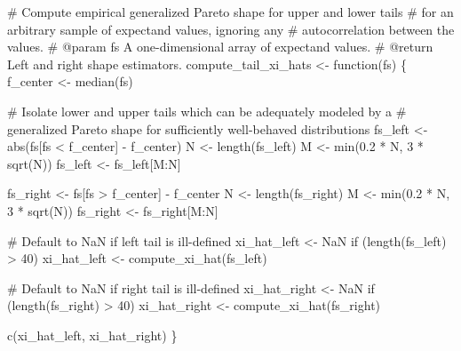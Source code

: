 \documentclass[
  letterpaper,
  DIV=11,
  numbers=noendperiod]{scrartcl}
\newenvironment{Shaded}{\begin{snugshade}}{\end{snugshade}}
\newcommand{\BuiltInTok}[1]{\textcolor[rgb]{0.00,0.23,0.31}{#1}}
\newcommand{\CommentTok}[1]{\textcolor[rgb]{0.37,0.37,0.37}{#1}}
\newcommand{\ControlFlowTok}[1]{\textcolor[rgb]{0.00,0.23,0.31}{#1}}
\newcommand{\DecValTok}[1]{\textcolor[rgb]{0.68,0.00,0.00}{#1}}
\newcommand{\FloatTok}[1]{\textcolor[rgb]{0.68,0.00,0.00}{#1}}
\newcommand{\NormalTok}[1]{\textcolor[rgb]{0.00,0.23,0.31}{#1}}
\newcommand{\OperatorTok}[1]{\textcolor[rgb]{0.37,0.37,0.37}{#1}}
\begin{document}
\begin{Shaded}
\begin{Highlighting}[]
\CommentTok{\# Compute empirical generalized Pareto shape for upper and lower tails}
\CommentTok{\# for an arbitrary sample of expectand values, ignoring any }
\CommentTok{\# autocorrelation between the values.}
\CommentTok{\# @param fs A one{-}dimensional array of expectand values.}
\CommentTok{\# @return Left and right shape estimators.}
\NormalTok{compute\_tail\_xi\_hats }\OperatorTok{\textless{}{-}}\NormalTok{ function(fs) \{}
\NormalTok{  f\_center }\OperatorTok{\textless{}{-}}\NormalTok{ median(fs)}
  
  \CommentTok{\# Isolate lower and upper tails which can be adequately modeled by a }
  \CommentTok{\# generalized Pareto shape for sufficiently well{-}behaved distributions}
\NormalTok{  fs\_left }\OperatorTok{\textless{}{-}} \BuiltInTok{abs}\NormalTok{(fs[fs }\OperatorTok{\textless{}}\NormalTok{ f\_center] }\OperatorTok{{-}}\NormalTok{ f\_center)}
\NormalTok{  N }\OperatorTok{\textless{}{-}}\NormalTok{ length(fs\_left)}
\NormalTok{  M }\OperatorTok{\textless{}{-}} \BuiltInTok{min}\NormalTok{(}\FloatTok{0.2} \OperatorTok{*}\NormalTok{ N, }\DecValTok{3} \OperatorTok{*}\NormalTok{ sqrt(N))}
\NormalTok{  fs\_left }\OperatorTok{\textless{}{-}}\NormalTok{ fs\_left[M:N]}
  
\NormalTok{  fs\_right }\OperatorTok{\textless{}{-}}\NormalTok{ fs[fs }\OperatorTok{\textgreater{}}\NormalTok{ f\_center] }\OperatorTok{{-}}\NormalTok{ f\_center}
\NormalTok{  N }\OperatorTok{\textless{}{-}}\NormalTok{ length(fs\_right)}
\NormalTok{  M }\OperatorTok{\textless{}{-}} \BuiltInTok{min}\NormalTok{(}\FloatTok{0.2} \OperatorTok{*}\NormalTok{ N, }\DecValTok{3} \OperatorTok{*}\NormalTok{ sqrt(N))}
\NormalTok{  fs\_right }\OperatorTok{\textless{}{-}}\NormalTok{ fs\_right[M:N]}
  
  \CommentTok{\# Default to NaN if left tail is ill{-}defined}
\NormalTok{  xi\_hat\_left }\OperatorTok{\textless{}{-}}\NormalTok{ NaN}
  \ControlFlowTok{if}\NormalTok{ (length(fs\_left) }\OperatorTok{\textgreater{}} \DecValTok{40}\NormalTok{)}
\NormalTok{    xi\_hat\_left }\OperatorTok{\textless{}{-}}\NormalTok{ compute\_xi\_hat(fs\_left)}

  \CommentTok{\# Default to NaN if right tail is ill{-}defined}
\NormalTok{  xi\_hat\_right }\OperatorTok{\textless{}{-}}\NormalTok{ NaN}
  \ControlFlowTok{if}\NormalTok{ (length(fs\_right) }\OperatorTok{\textgreater{}} \DecValTok{40}\NormalTok{)}
\NormalTok{    xi\_hat\_right }\OperatorTok{\textless{}{-}}\NormalTok{ compute\_xi\_hat(fs\_right)}

\NormalTok{  c(xi\_hat\_left, xi\_hat\_right)}
\NormalTok{\}}
\end{Highlighting}
\end{Shaded}
\end{document}
